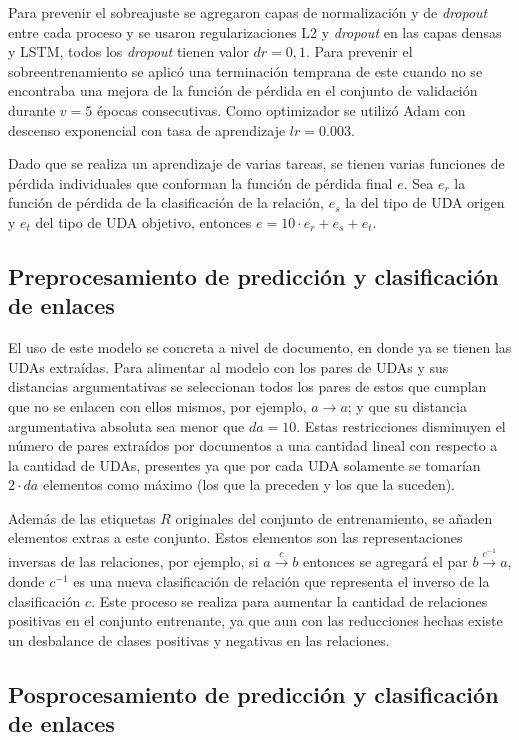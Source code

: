 \documentclass[a4paper,11pt,twocolumn,twoside]{article}
\begin{document}
Para prevenir el sobreajuste se agregaron capas de normalización y de \textit{dropout} entre cada 
proceso y se usaron regularizaciones L2 y \textit{dropout} en las capas densas y LSTM, 
todos los \textit{dropout} tienen valor $dr=0,1$. Para prevenir el sobreentrenamiento se aplicó una 
terminación temprana de este cuando no se encontraba una mejora de la función de pérdida en el 
conjunto de validación durante $v=5$ épocas consecutivas. Como optimizador se utilizó Adam con descenso 
exponencial con tasa de aprendizaje $lr=0.003$.

Dado que se realiza un aprendizaje de varias tareas, se tienen varias funciones de pérdida individuales que conforman 
la función de pérdida final $e$. Sea $e_r$ la función de pérdida de la clasificación de la relación, $e_s$ la del tipo de UDA origen  
y $e_t$ del tipo de UDA objetivo, entonces $e = 10 \cdot e_r + e_s + e_t$.

\subsection{Preprocesamiento de predicción y clasificación de enlaces}

El uso de este modelo se concreta a nivel de documento, en donde ya se tienen las UDAs extraídas. Para alimentar
al modelo con los pares de UDAs y sus distancias argumentativas se seleccionan todos los pares de estos que cumplan
que no se enlacen con ellos mismos, por ejemplo, $a \rightarrow a$; y que su distancia argumentativa absoluta sea menor 
que $da=10$. Estas restricciones disminuyen el número de pares extraídos por documentos a una cantidad lineal 
con respecto a la cantidad de UDAs, presentes ya que por cada UDA solamente se tomarían $2 \cdot da$ elementos como máximo
(los que la preceden y los que la suceden). 

Además de las etiquetas $R$ originales del conjunto de entrenamiento, se añaden elementos extras a este
conjunto. Estos elementos son las representaciones inversas de las relaciones, por ejemplo, si $a \xrightarrow{c} b$ entonces 
se agregará el par $b \xrightarrow{c^{-1}} a$, donde $c^{-1}$ es una nueva clasificación de relación que representa
el inverso de la clasificación $c$. Este proceso se realiza para aumentar la cantidad de relaciones positivas en el
conjunto entrenante, ya que aun con las reducciones hechas existe un desbalance de clases positivas y negativas en
las relaciones.

\subsection{Posprocesamiento de predicción y clasificación de enlaces}
\end{document}
